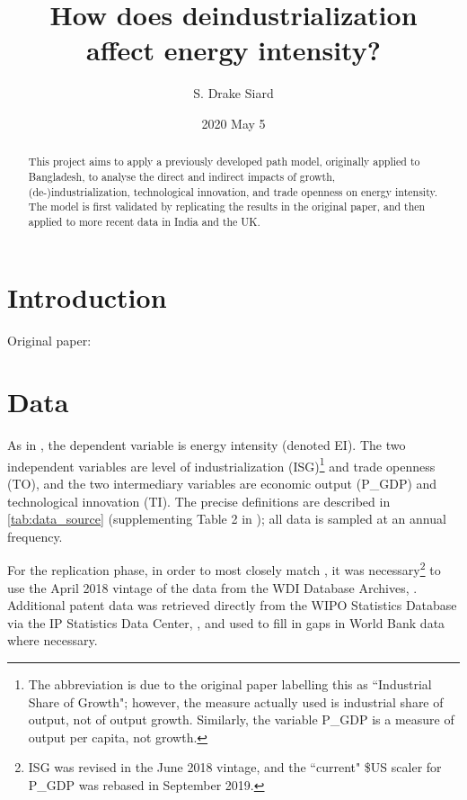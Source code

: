 \documentclass[11pt]{article}
\title{\textbf{How does deindustrialization\\ affect energy intensity?}}
\author{S. Drake Siard}
\date{2020 May 5}
\begin{document}
\maketitle

\begin{abstract}
This project aims to apply a previously developed path model, originally applied to Bangladesh, to analyse the direct and indirect impacts of growth, (de-)industrialization, technological innovation, and trade openness on energy intensity.
The model is first validated by replicating the results in the original paper, and then applied to more recent data in India and the UK.
\end{abstract}

\tableofcontents

\pagebreak

\section{Introduction}
Original paper: \cite{panHowIndustrializationTrade2019}



\section{Data}
 
As in \cite{panHowIndustrializationTrade2019}, the dependent variable is energy intensity (denoted EI). The two independent variables are level of industrialization (ISG)\footnote{
The abbreviation is due to the original paper labelling this as ``Industrial Share of Growth"; however, the measure actually used is industrial share of output, not of output growth. 
Similarly, the variable P\_GDP is a measure of output per capita, not growth.
} and trade openness (TO), and the two intermediary variables are economic output (P\_GDP) and technological innovation (TI).
The precise definitions are described in \cref{tab:data_source} (supplementing Table 2 in \cite{panHowIndustrializationTrade2019}); all data is sampled at an annual frequency.

For the replication phase, in order to most closely match \cite{panHowIndustrializationTrade2019}, it was necessary\footnote{
ISG was revised in the June 2018 vintage, and the ``current" \$US scaler for P\_GDP was rebased in September 2019.
} to use the April 2018 vintage of the data from the WDI Database Archives, \cite{theworldbankWDIDatabaseArchives2018}.
Additional patent data was retrieved directly from the WIPO Statistics Database via the IP Statistics Data Center, \cite{wipoWIPOStatisticsDatabase2020}, and used to fill in gaps in World Bank data where necessary.
\end{document}
